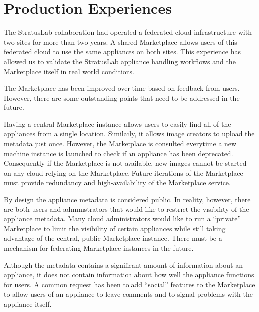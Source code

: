 \section{Production Experiences}
\label{sec:production}

The StratusLab collaboration had operated a federated cloud
infrastructure with two sites for more than two years.  A shared
Marketplace allows users of this federated cloud to use the same
appliances on both sites.  This experience has allowed us to validate
the StratusLab appliance handling workflows and the Marketplace itself
in real world conditions.

The Marketplace has been improved over time based on feedback from
users.  However, there are some outstanding points that need to be
addressed in the future.

Having a central Marketplace instance allows users to easily find all
of the appliances from a single location.  Similarly, it allows image
creators to upload the metadata just once.  However, the Marketplace
is consulted everytime a new machine instance is launched to check if
an appliance has been deprecated.  Consequently if the Marketplace is
not available, new images cannot be started on any cloud relying on
the Marketplace\@.  Future iterations of the Marketplace must provide
redundancy and high-availability of the Marketplace service. 

By design the appliance metadata is considered public.  In reality,
however, there are both users and administrators that would like to
restrict the visibility of the appliance metadata.  Many cloud
administrators would like to run a ``private'' Marketplace to limit
the visibility of certain appliances while still taking advantage of
the central, public Marketplace instance.  There must be a mechanism
for federating Marketplace instances in the future. 

Although the metadata contains a significant amount of information
about an appliance, it does not contain information about how well the
appliance functions for users.  A common request has been to add
``social'' features to the Marketplace to allow users of an appliance
to leave comments and to signal problems with the appliance itself.
